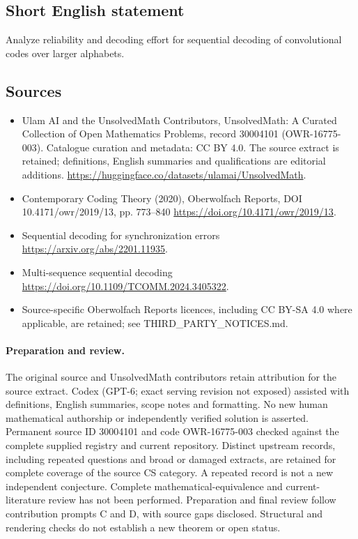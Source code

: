 \documentclass[11pt]{article}
\begin{document}
\subsection{Short English statement}
Analyze reliability and decoding effort for sequential decoding of convolutional codes over larger alphabets.
\subsection{Sources}
\begin{itemize}
\item[\hypertarget{source:30004101:1}{S1}] Ulam AI and the UnsolvedMath Contributors, UnsolvedMath: A Curated Collection of Open Mathematics Problems, record 30004101 (OWR-16775-003). Catalogue curation and metadata: CC BY 4.0. The source extract is retained; definitions, English summaries and qualifications are editorial additions.
\url{https://huggingface.co/datasets/ulamai/UnsolvedMath}.
\item[\hypertarget{source:30004101:2}{S2}] Contemporary Coding Theory (2020), Oberwolfach Reports, DOI 10.4171/owr/2019/13, pp. 773--840
\url{https://doi.org/10.4171/owr/2019/13}.
\item[\hypertarget{source:30004101:3}{S3}] Sequential decoding for synchronization errors
\url{https://arxiv.org/abs/2201.11935}.
\item[\hypertarget{source:30004101:4}{S4}] Multi-sequence sequential decoding
\url{https://doi.org/10.1109/TCOMM.2024.3405322}.
\item Source-specific Oberwolfach Reports licences, including CC BY-SA 4.0 where applicable, are retained; see THIRD\_PARTY\_NOTICES.md.
\end{itemize}
\paragraph{Preparation and review.}
The original source and UnsolvedMath contributors retain attribution for the source extract. Codex (GPT-6; exact serving revision not exposed) assisted with definitions, English summaries, scope notes and formatting. No new human mathematical authorship or independently verified solution is asserted. Permanent source ID 30004101 and code OWR-16775-003 checked against the complete supplied registry and current repository. Distinct upstream records, including repeated questions and broad or damaged extracts, are retained for complete coverage of the source CS category. A repeated record is not a new independent conjecture. Complete mathematical-equivalence and current-literature review has not been performed. Preparation and final review follow contribution prompts C and D, with source gaps disclosed. Structural and rendering checks do not establish a new theorem or open status.
\label{end:30004101}
\end{document}
